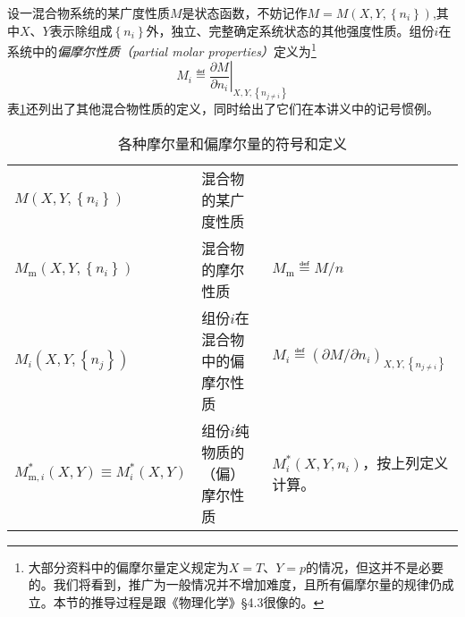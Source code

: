 \documentclass[main.tex]{subfiles}
\begin{document}
设一混合物系统的某广度性质$M$是状态函数，不妨记作$M=M\left(X,Y,\left\{n_i\right\}\right)$,其中$X$、$Y$表示除组成$\left\{n_i\right\}$外，独立、完整确定系统状态的其他强度性质。组份$i$在系统中的\emph{偏摩尔性质（partial molar properties）}定义为\footnote{大部分资料中的偏摩尔量定义规定为$X=T$、$Y=p$的情况，但这并不是必要的。我们将看到，推广为一般情况并不增加难度，且所有偏摩尔量的规律仍成立。本节的推导过程是跟《物理化学》\S4.3很像的。}
\[M_i\eqdef\left.\frac{\partial M}{\partial n_i}\right|_{X,Y,\left\{n_{j\neq i}\right\}}\]
表\ref{tab:molar_partial_molar_notaion}还列出了其他混合物性质的定义，同时给出了它们在本讲义中的记号惯例。

\begin{longtable}{p{}p{}p{}}
  \caption{各种摩尔量和偏摩尔量的符号和定义}\label{tab:molar_partial_molar_notaion}                                                                                                    \\
  \hline
  $M\left(X,Y,\left\{n_i\right\}\right)$                         & 混合物的某广度性质        &                                                                                  \\
  $M_\text{m}\left(X,Y,\left\{n_i\right\}\right)$                & 混合物的摩尔性质         & $M_\text{m}\eqdef M/n$                                                           \\
  $M_i\left(X,Y,\left\{n_j\right\}\right)$                       & 组份$i$在混合物中的偏摩尔性质 & $M_i\eqdef\left(\partial M/\partial n_i\right)_{X,Y,\left\{n_{j\neq i}\right\}}$ \\
  $M_{\text{m},i}^*\left(X,Y\right)\equiv M_i^*\left(X,Y\right)$ & 组份$i$纯物质的（偏）摩尔性质 & $M_i^*\left(X,Y,n_i\right)$，按上列定义计算。                                             \\
  \hline
\end{longtable}
\end{document}
